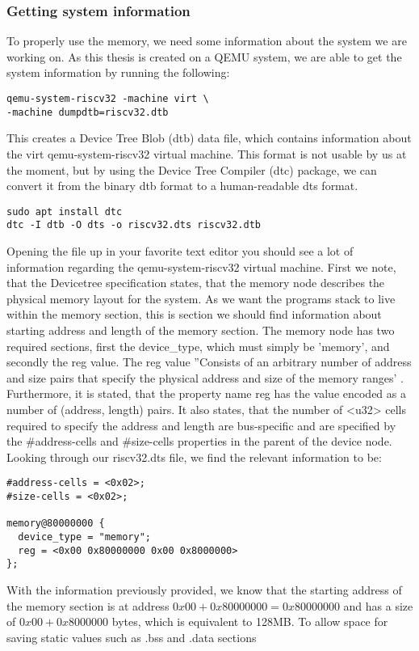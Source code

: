 \subsubsection*{Getting system information}\label{sec:sys-info}
To properly use the memory, we need some information about the system we are
working on. As this thesis is created on a QEMU system, we are able to get the
system information by running the following:
\begin{lstlisting}
qemu-system-riscv32 -machine virt \
-machine dumpdtb=riscv32.dtb
\end{lstlisting}
 This creates a Device Tree Blob (dtb) data file, which contains information
 about the virt qemu-system-riscv32 virtual machine. This format is not usable
 by us at the moment, but by using the Device Tree Compiler (dtc) package, we
 can convert it from the binary dtb format to a human-readable dts format.
\begin{lstlisting}
sudo apt install dtc
dtc -I dtb -O dts -o riscv32.dts riscv32.dtb
\end{lstlisting}
Opening the file up in your favorite text editor you should see a lot of
information regarding the qemu-system-riscv32 virtual machine. First we note,
that the Devicetree specification states, that the memory node describes the
physical memory layout for the system. As we want the programs stack to live
within the memory section, this is section we should find information about
starting address and length of the memory section. The memory node has two
required sections, first the device\_type, which must simply be 'memory', and
secondly the reg value. The reg value ''Consists of an arbitrary number of
address and size pairs that specify the physical address and size of the memory
ranges' \cite{DTS}. Furthermore, it is stated, that the property name reg has
the value encoded as a number of (address, length) pairs. It also states, that
the number of <u32> cells required to specify the address and length are
bus-specific and are specified by the \#address-cells and \#size-cells
properties in the parent of the device node. Looking through our riscv32.dts
file, we find the relevant information to be:
\begin{lstlisting}
#address-cells = <0x02>;
#size-cells = <0x02>;

memory@80000000 {
  device_type = "memory";
  reg = <0x00 0x80000000 0x00 0x8000000>
};
\end{lstlisting}
With the information previously provided, we know that the starting address of
the memory section is at address $0x00 + 0x80000000 = 0x80000000$ and has a size
of $0x00 + 0x8000000$ bytes, which is equivalent to 128MB. To allow space for
saving static values such as .bss and .data sections

